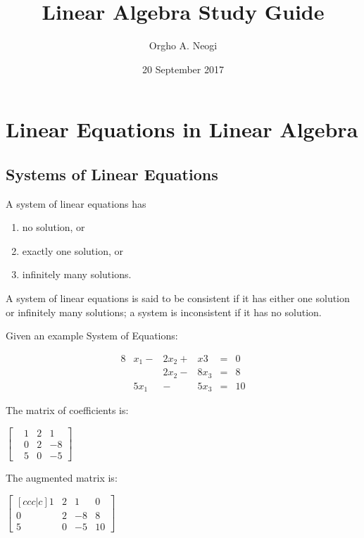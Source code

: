 \documentclass[oneside]{report}
\title{Linear Algebra Study Guide}
\author{Orgho A. Neogi}
\date{20 September 2017}
\begin{document}
\maketitle

\tableofcontents

\chapter{Linear Equations in Linear Algebra}


\section{Systems of Linear Equations}

A system of linear equations has

\begin{enumerate}
  \item no solution, or
  \item exactly one solution, or
  \item infinitely many solutions.
\end{enumerate}

A system of linear equations is said to be consistent if it has either one solution or
infinitely many solutions; a system is inconsistent if it has no solution.

Given an example System of Equations:

\begin{alignat*}{8}
  &x_1 - &2x_2 + &x3  &= &0 \\
  &     &2x_2 - &8x_3 &= &8 \\
  &5x_1 &     - &5x_3 &= &10
\end{alignat*}

The matrix of coefficients is:

\begin{center}
$\begin{bmatrix}
  &1 &2 &1\\
  &0 &2 &-8\\
  &5 &0 &-5
\end{bmatrix}$
\end{center}

The augmented matrix is:
\begin{center}
  $\begin{bmatrix}[ccc|c]
    1 &2 &1  &0\\
    0 &2 &-8 &8\\
    5 &0 &-5 &10
  \end{bmatrix}$
\end{center}
\end{document}
